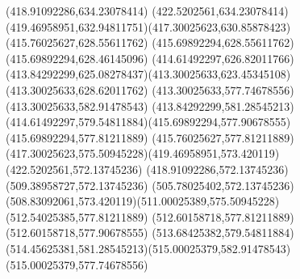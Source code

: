 {{\closepath
\moveto(418.91092286,634.23078414)
\lineto(422.5202561,634.23078414)
\curveto(419.46958951,632.94811751)(417.30025623,630.85878423)(415.76025627,628.55611762)
\lineto(415.69892294,628.55611762)
\lineto(415.69892294,628.46145096)
\curveto(414.61492297,626.82011766)(413.84292299,625.08278437)(413.30025633,623.45345108)
\lineto(413.30025633,628.62011762)
\closepath
\moveto(413.30025633,577.74678556)
\lineto(413.30025633,582.91478543)
\curveto(413.84292299,581.28545213)(414.61492297,579.54811884)(415.69892294,577.90678555)
\lineto(415.69892294,577.81211889)
\lineto(415.76025627,577.81211889)
\curveto(417.30025623,575.50945228)(419.46958951,573.420119)(422.5202561,572.13745236)
\lineto(418.91092286,572.13745236)
\closepath
\moveto(509.38958727,572.13745236)
\lineto(505.78025402,572.13745236)
\curveto(508.83092061,573.420119)(511.00025389,575.50945228)(512.54025385,577.81211889)
\lineto(512.60158718,577.81211889)
\lineto(512.60158718,577.90678555)
\curveto(513.68425382,579.54811884)(514.45625381,581.28545213)(515.00025379,582.91478543)
\lineto(515.00025379,577.74678556)
\closepath
}
}
